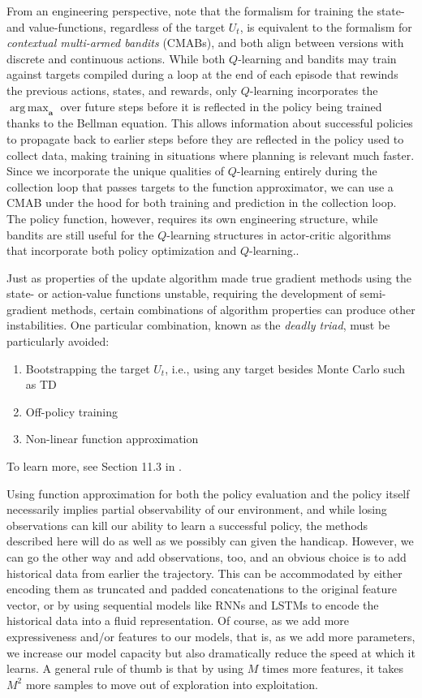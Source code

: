 \documentclass{article}
\DeclareMathOperator*{\argmax}{arg\,max}
\begin{document}
From an engineering perspective, note that the formalism for training the state- and value-functions, regardless of the target $U_t$, is equivalent to the formalism for \textit{contextual multi-armed bandits} (CMABs), and both align between versions with discrete and continuous actions. While both $Q$-learning and bandits may train against targets compiled during a loop at the end of each episode that rewinds the previous actions, states, and rewards, only $Q$-learning incorporates the $\argmax_\mathbf{a}$ over future steps before it is reflected in the policy being trained thanks to the Bellman equation. This allows information about successful policies to propagate back to earlier steps before they are reflected in the policy used to collect data, making training in situations where planning is relevant much faster. Since we incorporate the unique qualities of $Q$-learning entirely during the collection loop that passes targets to the function approximator, we can use a CMAB under the hood for both training and prediction in the collection loop.  The policy function, however, requires its own engineering structure, while bandits are still useful for the $Q$-learning structures in actor-critic algorithms that incorporate both policy optimization and $Q$-learning..

Just as properties of the update algorithm made true gradient methods using the state- or action-value functions unstable, requiring the development of semi-gradient methods, certain combinations of algorithm properties can produce other instabilities. One particular combination, known as the \textit{deadly triad}, must be particularly avoided:
\begin{enumerate}
\item Bootstrapping the target $U_t$, i.e., using any target besides Monte Carlo such as TD
\item Off-policy training
\item Non-linear function approximation
\end{enumerate}
To learn more, see Section 11.3 in \cite{sutton_barto_rl}.

Using function approximation for both the policy evaluation and the policy itself necessarily implies partial observability of our environment, and while losing observations can kill our ability to learn a successful policy, the methods described here will do as well as we possibly can given the handicap. However, we can go the other way and add observations, too, and an obvious choice is to add historical data from earlier the trajectory. This can be accommodated by either encoding them as truncated and padded concatenations to the original feature vector, or by using sequential models like RNNs and LSTMs to encode the historical data into a fluid representation. Of course, as we add more expressiveness and/or features to our models, that is, as we add more parameters, we increase our model capacity but also dramatically reduce the speed at which it learns. A general rule of thumb is that by using $M$ times more features, it takes $M^2$ more samples to move out of exploration into exploitation.
\end{document}
